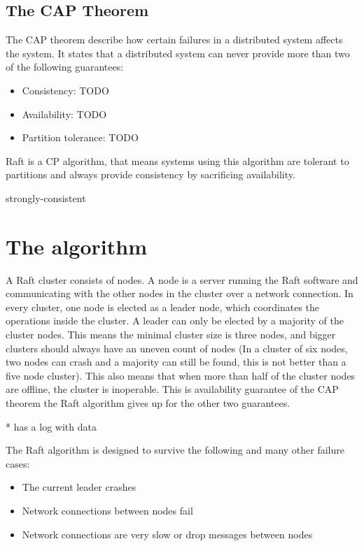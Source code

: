 \subsection{The CAP Theorem}

The CAP theorem describe how certain failures in a distributed system affects the system. It states that a distributed system can never provide more than two of the following guarantees:

\begin{itemize}
    \item Consistency: TODO
    \item Availability: TODO
    \item Partition tolerance: TODO
\end{itemize}

Raft is a CP algorithm, that means systems using this algorithm are tolerant to partitions and always provide consistency by sacrificing availability. 

strongly-consistent

\section{The algorithm}
A Raft cluster consists of nodes. A node is a server running the Raft software and communicating with the other nodes in the cluster over a network connection.
In every cluster, one node is elected as a leader node, which coordinates the operations inside the cluster. A leader can only be elected by
a majority of the cluster nodes. This means the minimal cluster size is three nodes, and bigger clusters should always have an uneven count of nodes (In a cluster
of six nodes, two nodes can crash and a majority can still be found, this is not better than a five node cluster).
This also means that when more than half of the cluster nodes are offline, the cluster is inoperable. This is availability guarantee of the CAP theorem the Raft algorithm gives up
for the other two guarantees. 

* has a log with data

The Raft algorithm is designed to survive the following and many other failure cases:
\begin{itemize}
    \item The current leader crashes
    \item Network connections between nodes fail
    \item Network connections are very slow or drop messages between nodes
\end{itemize}

